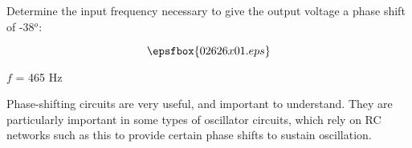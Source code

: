 

Determine the input frequency necessary to give the output voltage a phase shift of -38$^{o}$:

$$\epsfbox{02626x01.eps}$$







$f$ = 465 Hz







Phase-shifting circuits are very useful, and important to understand.  They are particularly important in some types of oscillator circuits, which rely on RC networks such as this to provide certain phase shifts to sustain oscillation.




